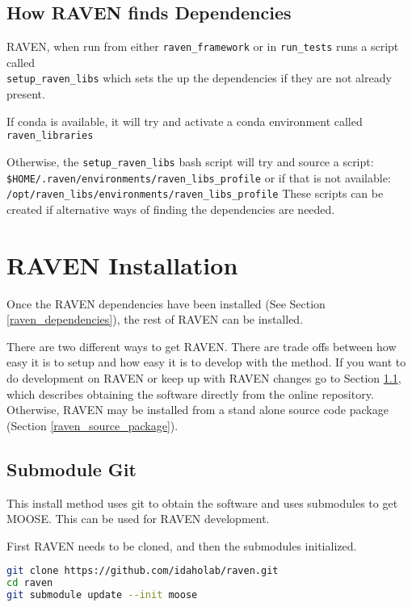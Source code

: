 \goToRavenInstallation

\subsection{How RAVEN finds Dependencies}

RAVEN, when run from either \texttt{raven\_framework} or in
\texttt{run\_tests} runs a script called\\ \texttt{setup\_raven\_libs}
which sets the up the dependencies if they are not already present.

If conda is available, it will try and activate a conda environment
called \texttt{raven\_libraries}

Otherwise, the \texttt{setup\_raven\_libs} bash script will try and
source a script:\\
\verb'$HOME/.raven/environments/raven_libs_profile'
or if that is not available:\\
\verb'/opt/raven_libs/environments/raven_libs_profile' These scripts
can be created if alternative ways of finding the dependencies are
needed.

\section{RAVEN Installation}
\label{raven_installation}

Once the RAVEN dependencies have been installed (See Section
\ref{raven_dependencies}), the rest of RAVEN can be installed.

There are two different ways to get RAVEN.  There are trade offs
between how easy it is to setup and how easy it is to develop with the
method.  If you want to do development on RAVEN or keep up with RAVEN
changes go to Section \ref{submodule_git}, which describes obtaining
the software directly from the online repository.  Otherwise, RAVEN
may be installed from a stand alone source code package (Section
\ref{raven_source_package}).


\subsection{Submodule Git}
\label{submodule_git}

This install method uses git to obtain the software and uses
submodules to get MOOSE.  This can be used for RAVEN development.

First RAVEN needs to be cloned, and then the submodules initialized.

\begin{lstlisting}[language=bash]
git clone https://github.com/idaholab/raven.git
cd raven
git submodule update --init moose
\end{lstlisting}

